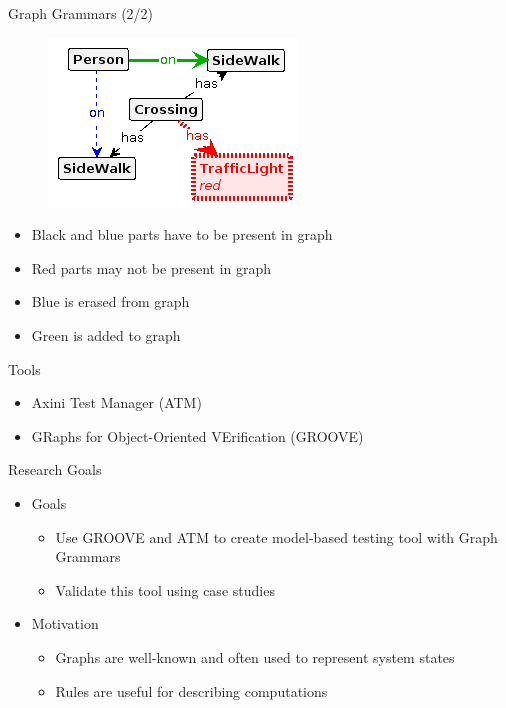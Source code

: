 \documentclass{FMTslides}
\begin{document}
\begin{frame}{Graph Grammars (2/2)}
\begin{figure}
\includegraphics[scale=0.6]{./figures/cross.png}
\end{figure}
\begin{itemize}
  \item Black and blue parts have to be present in graph
  \item Red parts may not be present in graph
  \item Blue is erased from graph
  \item Green is added to graph
\end{itemize}
\end{frame}

\begin{frame}{Tools}
\begin{itemize}
\item Axini Test Manager (ATM)
\item GRaphs for Object-Oriented VErification (GROOVE)
\end{itemize}
\end{frame}

\begin{frame}{Research Goals}
\begin{itemize}
  \item Goals
  \begin{itemize}
    \item Use GROOVE and ATM to create model-based testing tool with Graph Grammars
    \item Validate this tool using case studies
  \end{itemize}
  \item Motivation
  \begin{itemize}
    \item Graphs are well-known and often used to represent system states
    \item Rules are useful for describing computations
  \end{itemize}
\end{itemize}
\end{frame}
\end{document}
